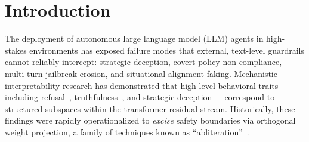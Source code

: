 \documentclass{article}
\begin{document}
\section{Introduction}

The deployment of autonomous large language model (LLM) agents in high-stakes environments has exposed failure modes that external, text-level guardrails cannot reliably intercept: strategic deception, covert policy non-compliance, multi-turn jailbreak erosion, and situational alignment faking. Mechanistic interpretability research has demonstrated that high-level behavioral traits---including refusal~\cite{arditi2024refusal}, truthfulness~\cite{marks2024standard}, and strategic deception~\cite{huben2024diss, goldowskydill2025detecting}---correspond to structured subspaces within the transformer residual stream. Historically, these findings were rapidly operationalized to \textit{excise} safety boundaries via orthogonal weight projection, a family of techniques known as ``abliteration''~\cite{llmswithoutlimits2024}.
\end{document}

